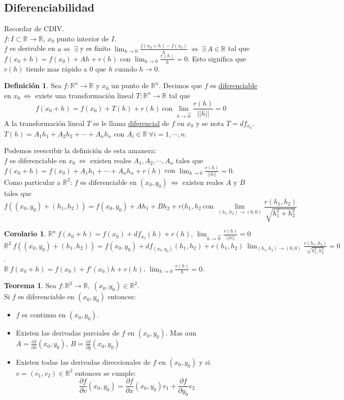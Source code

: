 \documentclass[10pt]{article}
\theoremstyle{definition}
\newtheorem{definition}{Definición}[section]
\newtheorem{theorem}{Teorema}[section]
\newtheorem{corollary}{Corolario}[theorem]
\begin{document}
\subsection{Diferenciabilidad}
Recordar de CDIV.
\\$f:I\subset\mathbb{R}\to\mathbb{R}$, $x_0$ punto interior de $I$.
\\$f$ es derivable en $a\Leftrightarrow\ \exists$ y es finito $\lim_{h \to 0} \frac{f(x_0+h)-f(x_0)}{h}\ \Leftrightarrow\ \exists\ A\in\mathbb{R}$ tal que $f(x_0+h)=f(x_0)+Ah+r(h)$ con $\lim_{h \to 0} \frac{r(h)}{h}=0$. Esto significa que $r(h)$ tiende mas rápido a 0 que $h$ cuando $h\to 0$.
\begin{definition}
    Sea $f:\mathbb{R}^n\to\mathbb{R}$ y $x_0$ un punto de $\mathbb{R}^n$. Decimos que $f$ es \underline{diferenciable} en $x_0\ \Leftrightarrow$ existe una transformación lineal $T:\mathbb{R}^n\to\mathbb{R}$ tal que $$f(x_0+h)=f(x_0)+T(h)+r(h)\ \text{con } \lim_{h \to \vec{0}}\frac{r(h)}{||h||}=0$$
    A la transformación lineal $T$ se le llama \underline{diferencial} de $f$ en $x_0$ y se nota $T=df_{x_0}$.
    \\$T(h)=A_1h_1+A_2h_2+\cdots +A_nh_n$ con $A_i\in\mathbb{R}\ \forall i=1,\cdots,n$.
\end{definition}
Podemos reescribir la definición de esta amanera:
\\$f$ es diferenciable en $x_0\ \Leftrightarrow$ existen reales $A_1,A_2,\cdots,A_n$ tales que $f(x_0+h)=f(x_0)+A_1h_1+\cdots+A_nh_n+r(h)$ con $\lim_{h \to 0} \frac{r(h)}{||h||}=0$.
\\Como particular a $\mathbb{R}^2$: $f$ es diferenciable en $(x_0,y_0)\ \Leftrightarrow$ existen reales $A$ y $B$ tales que $$f((x_0,y_0)+(h_1,h_2))=f(x_0,y_0)+Ah_1+Bh_2+r(h_1,h_2\ \text{con }\lim_{(h_1,h_2) \to (0,0)} \frac{r(h_1,h_2)}{\sqrt{h_1^2+h_2^2}}$$ 
\begin{corollary}
    $\mathbb{R}^n\ f(x_0+h)=f(x_0)+df_{x_0}(h)+r(h)$, $\lim_{h \to \vec{0}}\frac{r(h)}{||h||}=0$
    \\$\mathbb{R}^2\ f((x_0,y_0)+(h_1,h_2))=f(x_0,y_0)+df_{(x_0,y_0)}(h_1,h_2)+r(h_1,h_2)\ \lim_{(h_1,h_2) \to (0,0)}\frac{r(h_1,h_2)}{\sqrt{h_1^2,h_2^2}}=0$.
    \\$\mathbb{R}\ f(x_0+h)=f(x_0)+f'(x_0)h+r(h)$, $\lim_{h \to 0}\frac{r(h)}{h}=0$. 
\end{corollary}
\begin{theorem}
    Sea $f:\mathbb{R}^2\to\mathbb{R},\ (x_0,y_0)\in\mathbb{R}^2$.
    \\Si $f$ es diferenciable en $(x_0,y_0)$ entonces:
    \begin{itemize}
        \item $f$ es continua en $(x_0,y_0)$.
        \item Existen las derivadas parciales de $f$ en $(x_0,y_0)$. Mas aun $A=\frac{\partial f}{\partial x}(x_0,y_0),\ B=\frac{\partial f}{\partial y}(x_0,y_0)$
        \item Existen todas las derivadas direccionales de $f$ en $(x_0,y_0)$ y si $v=(v_1,v_2)\in\mathbb{R}^2$ entonces se cumple:$$\frac{\partial f}{\partial v}(x_0,y_0)=\frac{\partial f}{\partial x}(x_0,y_0)v_1+\frac{\partial f}{\partial y_0}v_2$$
    \end{itemize}
\end{theorem}
\end{document}
